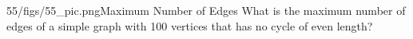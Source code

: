 \begin{problem}{55/figs/55_pic.png}{Maximum Number of Edges}  What is the maximum number of edges of a simple graph with 100 vertices that has no cycle of even length?
\end{problem}
